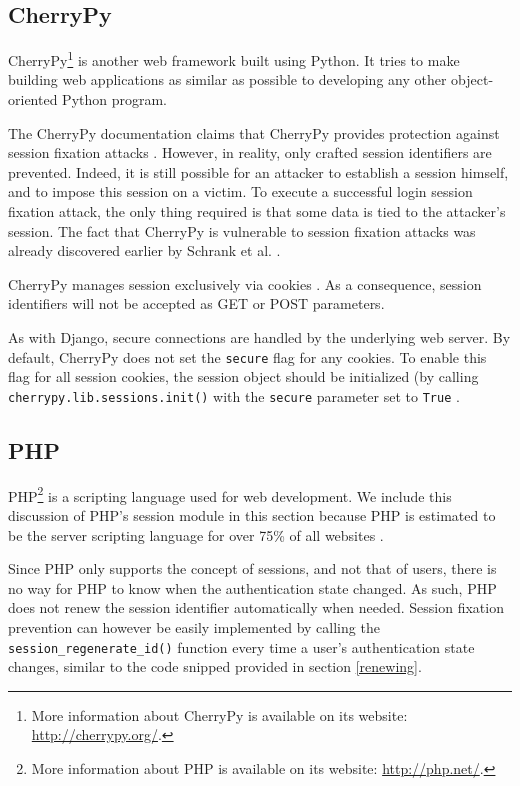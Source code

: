 \subsection{CherryPy}

CherryPy\footnote{More information about CherryPy is available on its website: \url{http://cherrypy.org/}.} is another web framework built using Python. It tries to make building web applications as similar as possible to developing any other object-oriented Python program.

The CherryPy documentation claims that CherryPy provides protection against session fixation attacks \cite{CherryPySessions}. However, in reality, only crafted session identifiers are prevented. Indeed, it is still possible for an attacker to establish a session himself, and to impose this session on a victim. To execute a successful login session fixation attack, the only thing required is that some data is tied to the attacker's session. The fact that CherryPy is vulnerable to session fixation attacks was already discovered earlier by Schrank et al. \cite{Schrank2010}.

CherryPy manages session exclusively via cookies \cite{CherryPySessions}. As a consequence, session identifiers will not be accepted as GET or POST parameters.

As with Django, secure connections are handled by the underlying web server. By default, CherryPy does not set the \texttt{secure} flag for any cookies. To enable this flag for all session cookies, the session object should be initialized (by calling \texttt{cherrypy.lib.sessions.init()} with the \texttt{secure} parameter set to \texttt{True} \cite{CherryPySessions}.

\subsection{PHP}

PHP\footnote{More information about PHP is available on its website: \url{http://php.net/}.} is a scripting language used for web development. We include this discussion of PHP's session module in this section because PHP is estimated to be the server scripting language for over 75\% of all websites \cite{ServerSurvey}.

Since PHP only supports the concept of sessions, and not that of users, there is no way for PHP to know when the authentication state changed. As such, PHP does not renew the session identifier automatically when needed. Session fixation prevention can however be easily implemented by calling the \texttt{session\_regenerate\_id()} function every time a user's authentication state changes, similar to the code snipped provided in section \ref{renewing}.

